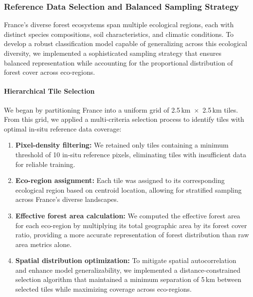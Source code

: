 \subsubsection{Reference Data Selection and Balanced Sampling Strategy}

France's diverse forest ecosystems span multiple ecological regions, each with distinct species compositions, soil characteristics, and climatic conditions. To develop a robust classification model capable of generalizing across this ecological diversity, we implemented a sophisticated sampling strategy that ensures balanced representation while accounting for the proportional distribution of forest cover across eco-regions.

\paragraph{Hierarchical Tile Selection}
We began by partitioning France into a uniform grid of 2.5\,km~$\times$~2.5\,km tiles. From this grid, we applied a multi-criteria selection process to identify tiles with optimal in-situ reference data coverage:

\begin{enumerate}
    \item \textbf{Pixel-density filtering:} We retained only tiles containing a minimum threshold of 10 in-situ reference pixels, eliminating tiles with insufficient data for reliable training.
    
    \item \textbf{Eco-region assignment:} Each tile was assigned to its corresponding ecological region based on centroid location, allowing for stratified sampling across France's diverse landscapes.
    
    \item \textbf{Effective forest area calculation:} We computed the effective forest area for each eco-region by multiplying its total geographic area by its forest cover ratio, providing a more accurate representation of forest distribution than raw area metrics alone.
    
    \item \textbf{Spatial distribution optimization:} To mitigate spatial autocorrelation and enhance model generalizability, we implemented a distance-constrained selection algorithm that maintained a minimum separation of 5\,km between selected tiles while maximizing coverage across eco-regions.
\end{enumerate}

